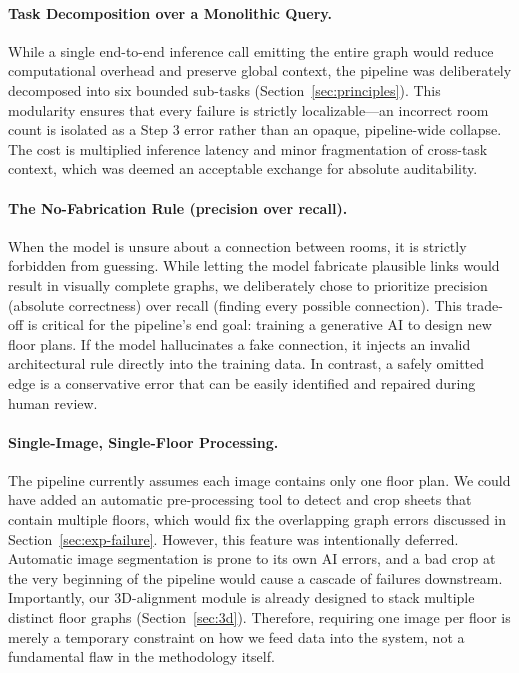 \documentclass[12pt,a4paper,openright]{report}
\begin{document}
\paragraph{Task Decomposition over a Monolithic Query.} While a single end-to-end inference call emitting the entire graph would reduce computational overhead and preserve global context, the pipeline was deliberately decomposed into six bounded sub-tasks (Section~\ref{sec:principles}). This modularity ensures that every failure is strictly localizable---an incorrect room count is isolated as a Step 3 error rather than an opaque, pipeline-wide collapse. The cost is multiplied inference latency and minor fragmentation of cross-task context, which was deemed an acceptable exchange for absolute auditability.

\paragraph{The No-Fabrication Rule (precision over recall).} When the model is unsure about a connection between rooms, it is strictly forbidden from guessing. While letting the model fabricate plausible links would result in visually complete graphs, we deliberately chose to prioritize precision (absolute correctness) over recall (finding every possible connection). This trade-off is critical for the pipeline's end goal: training a generative AI to design new floor plans. If the model hallucinates a fake connection, it injects an invalid architectural rule directly into the training data. In contrast, a safely omitted edge is a conservative error that can be easily identified and repaired during human review.

\paragraph{Single-Image, Single-Floor Processing.} The pipeline currently assumes each image contains only one floor plan. We could have added an automatic pre-processing tool to detect and crop sheets that contain multiple floors, which would fix the overlapping graph errors discussed in Section~\ref{sec:exp-failure}. However, this feature was intentionally deferred. Automatic image segmentation is prone to its own AI errors, and a bad crop at the very beginning of the pipeline would cause a cascade of failures downstream. Importantly, our 3D-alignment module is already designed to stack multiple distinct floor graphs (Section~\ref{sec:3d}). Therefore, requiring one image per floor is merely a temporary constraint on how we feed data into the system, not a fundamental flaw in the methodology itself.
\end{document}
